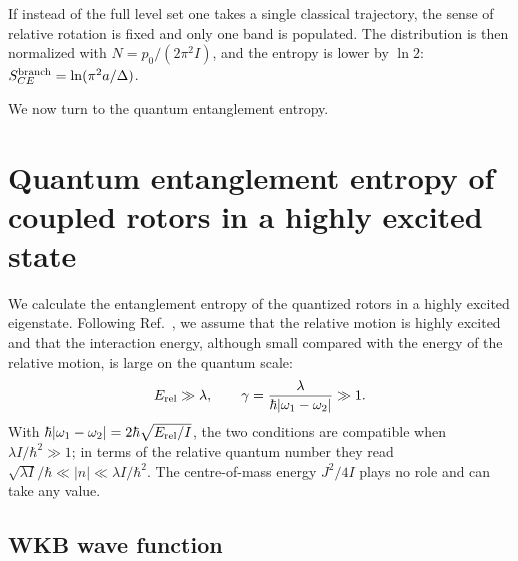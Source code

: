 \documentclass[aps,preprint,12pt,superscriptaddress,nofootinbib]{revtex4-2}
\newcommand{\Erel}{E_{\rm rel}}
\begin{document}
If instead of the full level set one takes a single classical trajectory, the sense
of relative rotation is fixed and only one band is populated. The distribution is
then normalized with $N=p_{0}/(2\pi^{2}I)$, and the entropy is lower by $\ln2$:
$S_{CE}^{\rm branch}=\ln(\pi^{2}a/\Delta)$.

We now turn to the quantum entanglement entropy.

\section{Quantum entanglement entropy of coupled rotors in a highly excited state}
\label{sec:quantum}

We calculate the entanglement entropy of the quantized rotors in a highly excited
eigenstate. Following Ref.~\cite{DKS}, we assume that the relative motion is highly
excited and that the interaction energy, although small compared with the energy of
the relative motion, is large on the quantum scale:
\begin{equation}
\Erel\gg\lambda,\qquad
\gamma=\frac{\lambda}{\hbar|\omega_{1}-\omega_{2}|}\gg1 .
\label{eq:regime}
\end{equation}
With $\hbar|\omega_{1}-\omega_{2}|=2\hbar\sqrt{\Erel/I}$, the two conditions are
compatible when $\lambda I/\hbar^{2}\gg1$; in terms of the relative quantum number
they read $\sqrt{\lambda I}/\hbar\ll|n|\ll\lambda I/\hbar^{2}$. The centre-of-mass
energy $J^{2}/4I$ plays no role and can take any value.

\subsection{WKB wave function}
\end{document}
